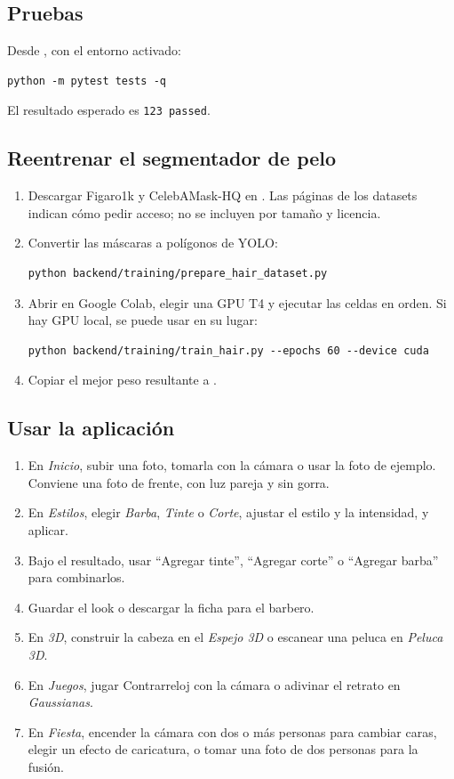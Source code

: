 \subsection{Pruebas}

Desde , con el entorno activado:
\begin{lstlisting}
python -m pytest tests -q
\end{lstlisting}
El resultado esperado es \texttt{123 passed}.

\subsection{Reentrenar el segmentador de pelo}

\begin{enumerate}
  \item Descargar Figaro1k \cite{svanera2016} y CelebAMask-HQ \cite{lee2020} en . Las páginas de los datasets indican cómo pedir acceso; no se incluyen por tamaño y licencia.
  \item Convertir las máscaras a polígonos de YOLO:
\begin{lstlisting}
python backend/training/prepare_hair_dataset.py
\end{lstlisting}
  \item Abrir  en Google Colab, elegir una GPU T4 y ejecutar las celdas en orden. Si hay GPU local, se puede usar en su lugar:
\begin{lstlisting}
python backend/training/train_hair.py --epochs 60 --device cuda
\end{lstlisting}
  \item Copiar el mejor peso resultante a .
\end{enumerate}

\subsection{Usar la aplicación}

\begin{enumerate}
  \item En \emph{Inicio}, subir una foto, tomarla con la cámara o usar la foto de ejemplo. Conviene una foto de frente, con luz pareja y sin gorra.
  \item En \emph{Estilos}, elegir \emph{Barba}, \emph{Tinte} o \emph{Corte}, ajustar el estilo y la intensidad, y aplicar.
  \item Bajo el resultado, usar ``Agregar tinte'', ``Agregar corte'' o ``Agregar barba'' para combinarlos.
  \item Guardar el look o descargar la ficha para el barbero.
  \item En \emph{3D}, construir la cabeza en el \emph{Espejo 3D} o escanear una peluca en \emph{Peluca 3D}.
  \item En \emph{Juegos}, jugar Contrarreloj con la cámara o adivinar el retrato en \emph{Gaussianas}.
  \item En \emph{Fiesta}, encender la cámara con dos o más personas para cambiar caras, elegir un efecto de caricatura, o tomar una foto de dos personas para la fusión.
\end{enumerate}
